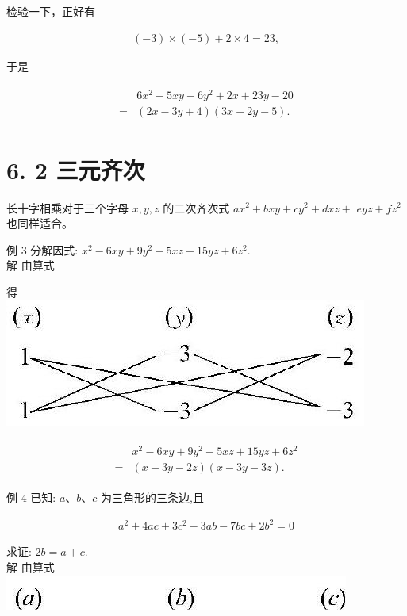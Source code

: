 \documentclass[10pt]{article}
\begin{document}
检验一下，正好有

\begin{align*}
(-3) \times(-5)+2 \times 4=23,
\end{align*}

于是

\begin{align*}
\begin{aligned}
& 6 x^{2}-5 x y-6 y^{2}+2 x+23 y-20 \\
= & (2 x-3 y+4)(3 x+2 y-5) .
\end{aligned}
\end{align*}

\section*{6. 2 三元齐次}
长十字相乘对于三个字母 $x, y, z$ 的二次齐次式 $a x^{2}+b x y+c y^{2}+d x z+$ $e y z+f z^{2}$ 也同样适合。

例 3 分解因式: $x^{2}-6 x y+9 y^{2}-5 x z+15 y z+6 z^{2}$.\\
解 由算式

得\\
\includegraphics[max width=\textwidth, center]{2024_10_30_bd799899fef40368a068g-043(1)}

\begin{align*}
\begin{aligned}
& x^{2}-6 x y+9 y^{2}-5 x z+15 y z+6 z^{2} \\
= & (x-3 y-2 z)(x-3 y-3 z) .
\end{aligned}
\end{align*}

例 4 已知: $a 、 b 、 c$ 为三角形的三条边,且

\begin{align*}
a^{2}+4 a c+3 c^{2}-3 a b-7 b c+2 b^{2}=0
\end{align*}

求证: $2 b=a+c$.\\
解 由算式\\
\includegraphics[max width=\textwidth, center]{2024_10_30_bd799899fef40368a068g-043}
\end{document}
